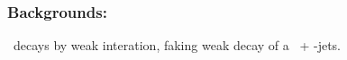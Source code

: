 \begin{frame}
\frametitle{Backgrounds: \quarkt\antiquarkt}
\begin{block}{\quarkt\antiquarkt}
\quarkt\ decays by weak interation, faking weak decay of a \tau\ + \quarkb-jets.
\end{block}
\end{frame}
